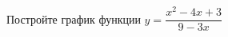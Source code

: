 \begin{ex}
	\begin{condition}
		Постройте график функции \( y=\dfrac{x^2-4x+3}{9-3x} \)
	\end{condition}
\end{ex}